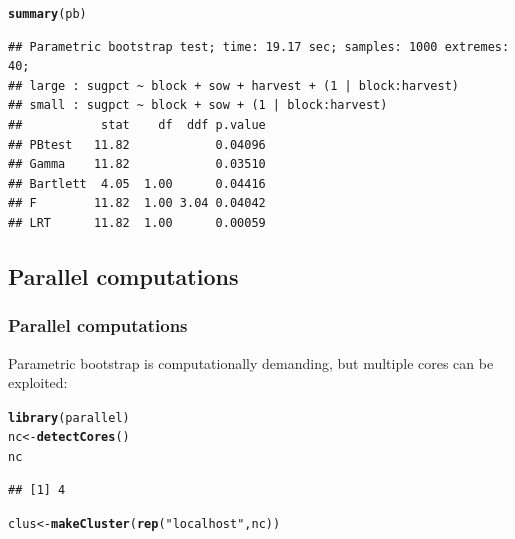 \documentclass[compress]{beamer}\usepackage[]{graphicx}\usepackage[]{color}
\makeatletter
\newcommand{\hlstr}[1]{\textcolor[rgb]{0.192,0.494,0.8}{#1}}%
\newcommand{\hlstd}[1]{\textcolor[rgb]{0.345,0.345,0.345}{#1}}%
\newcommand{\hlkwb}[1]{\textcolor[rgb]{0.69,0.353,0.396}{#1}}%
\newcommand{\hlkwd}[1]{\textcolor[rgb]{0.737,0.353,0.396}{\textbf{#1}}}%
\newenvironment{kframe}{%
 \def\at@end@of@kframe{}%
 \ifinner\ifhmode%
  \def\at@end@of@kframe{\end{minipage}}%
  \begin{minipage}{\columnwidth}%
 \fi\fi%
 \def\FrameCommand##1{\hskip\@totalleftmargin \hskip-\fboxsep
 \colorbox{shadecolor}{##1}\hskip-\fboxsep
     \hskip-\linewidth \hskip-\@totalleftmargin \hskip\columnwidth}%
 \MakeFramed {\advance\hsize-\width
   \@totalleftmargin\z@ \linewidth\hsize
   \@setminipage}}%
 {\par\unskip\endMakeFramed%
 \at@end@of@kframe}
\newenvironment{knitrout}{}{} %
\newenvironment{sframe}
{\begin{frame} [containsverbatim] }
  {\end{frame}}
\makeatother
\begin{document}
\begin{sframe}
\begin{knitrout}\tiny
{}\color{fgcolor}\begin{kframe}
\begin{alltt}
\hlkwd{summary}\hlstd{(pb)}
\end{alltt}
\begin{verbatim}
## Parametric bootstrap test; time: 19.17 sec; samples: 1000 extremes: 40;
## large : sugpct ~ block + sow + harvest + (1 | block:harvest)
## small : sugpct ~ block + sow + (1 | block:harvest)
##           stat    df  ddf p.value
## PBtest   11.82            0.04096
## Gamma    11.82            0.03510
## Bartlett  4.05  1.00      0.04416
## F        11.82  1.00 3.04 0.04042
## LRT      11.82  1.00      0.00059
\end{verbatim}
\end{kframe}
\end{knitrout}
  \end{sframe}


\subsection{Parallel computations}

\begin{sframe}
\frametitle{Parallel computations}

Parametric bootstrap is computationally demanding, but multiple cores can be exploited:


  
\begin{knitrout}\tiny
{}\color{fgcolor}\begin{kframe}
\begin{alltt}
\hlkwd{library}\hlstd{(parallel)}
\hlstd{nc} \hlkwb{<-} \hlkwd{detectCores}\hlstd{()}
\hlstd{nc}
\end{alltt}
\begin{verbatim}
## [1] 4
\end{verbatim}
\end{kframe}
\end{knitrout}

\begin{knitrout}\tiny
{}\color{fgcolor}\begin{kframe}
\begin{alltt}
\hlstd{clus} \hlkwb{<-} \hlkwd{makeCluster}\hlstd{(}\hlkwd{rep}\hlstd{(}\hlstr{"localhost"}\hlstd{, nc))}
\end{alltt}
\end{kframe}
\end{knitrout}

\end{sframe}
\end{document}
